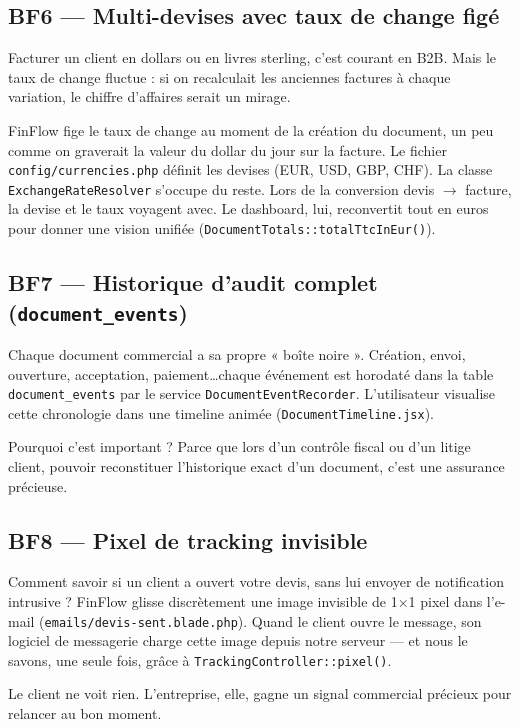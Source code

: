 \documentclass[12pt,a4paper]{report}
\begin{document}
\subsection{BF6 — Multi-devises avec taux de change figé}

Facturer un client en dollars ou en livres sterling, c'est courant en B2B. Mais le taux de change fluctue : si on recalculait les anciennes factures à chaque variation, le chiffre d'affaires serait un mirage.

FinFlow fige le taux de change au moment de la création du document, un peu comme on graverait la valeur du dollar du jour sur la facture. Le fichier \texttt{config/currencies.php} définit les devises (EUR, USD, GBP, CHF). La classe \texttt{ExchangeRateResolver} s'occupe du reste. Lors de la conversion devis $\rightarrow$ facture, la devise et le taux voyagent avec. Le dashboard, lui, reconvertit tout en euros pour donner une vision unifiée (\texttt{DocumentTotals::totalTtcInEur()}).

\subsection{BF7 — Historique d'audit complet (\texttt{document\_events})}

Chaque document commercial a sa propre « boîte noire ». Création, envoi, ouverture, acceptation, paiement\ldots chaque événement est horodaté dans la table \texttt{document\_events} par le service \texttt{DocumentEventRecorder}. L'utilisateur visualise cette chronologie dans une timeline animée (\texttt{DocumentTimeline.jsx}).

Pourquoi c'est important ? Parce que lors d'un contrôle fiscal ou d'un litige client, pouvoir reconstituer l'historique exact d'un document, c'est une assurance précieuse.

\subsection{BF8 — Pixel de tracking invisible}

Comment savoir si un client a ouvert votre devis, sans lui envoyer de notification intrusive ? FinFlow glisse discrètement une image invisible de 1$\times$1 pixel dans l'e-mail (\texttt{emails/devis-sent.blade.php}). Quand le client ouvre le message, son logiciel de messagerie charge cette image depuis notre serveur --- et nous le savons, une seule fois, grâce à \texttt{TrackingController::pixel()}.

Le client ne voit rien. L'entreprise, elle, gagne un signal commercial précieux pour relancer au bon moment.
\end{document}
